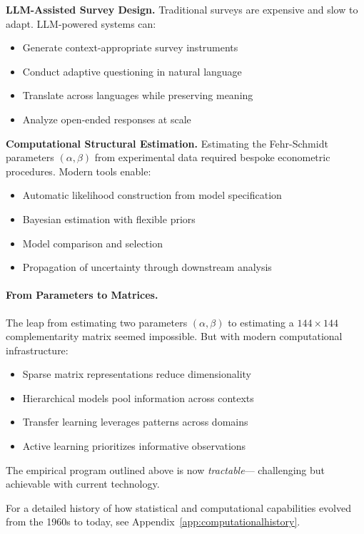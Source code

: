 \documentclass[12pt,a4paper]{article}
\begin{document}
\textbf{LLM-Assisted Survey Design.}
Traditional surveys are expensive and slow to adapt.
LLM-powered systems \citep{brown2020,vaswani2017} can:
\begin{itemize}
  \item Generate context-appropriate survey instruments
  \item Conduct adaptive questioning in natural language
  \item Translate across languages while preserving meaning
  \item Analyze open-ended responses at scale
\end{itemize}

\textbf{Computational Structural Estimation.}
Estimating the Fehr-Schmidt parameters $(\alpha, \beta)$ from experimental data
required bespoke econometric procedures. Modern tools enable:
\begin{itemize}
  \item Automatic likelihood construction from model specification
  \item Bayesian estimation with flexible priors
  \item Model comparison and selection
  \item Propagation of uncertainty through downstream analysis
\end{itemize}

\paragraph{From Parameters to Matrices.}
The leap from estimating two parameters $(\alpha, \beta)$ to estimating
a $144 \times 144$ complementarity matrix seemed impossible.
But with modern computational infrastructure:
\begin{itemize}
  \item Sparse matrix representations reduce dimensionality
  \item Hierarchical models pool information across contexts
  \item Transfer learning leverages patterns across domains
  \item Active learning prioritizes informative observations
\end{itemize}

The empirical program outlined above is now \emph{tractable}---
challenging but achievable with current technology.

For a detailed history of how statistical and computational capabilities
evolved from the 1960s to today, see Appendix~\ref{app:computationalhistory}.
\end{document}
